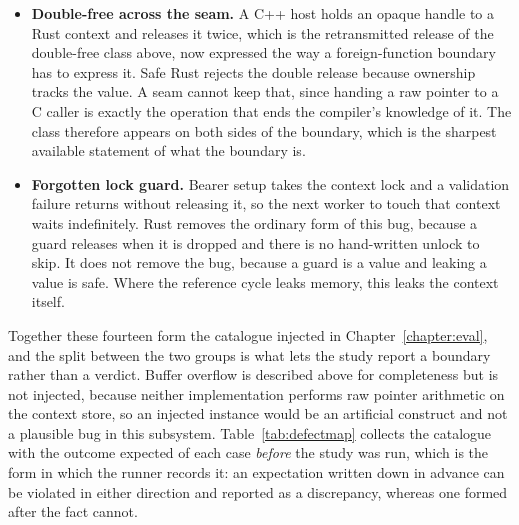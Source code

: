 \documentclass[english,oneside,a4paper,censored,csm,software-track-2020]{HYthesisML}
\begin{document}
\begin{itemize}
        availability argument, and addressed by nothing in either type system.
  \item \textbf{Double-free across the seam.} A C++ host holds an opaque handle to a Rust
        context and releases it twice, which is the retransmitted release of the double-free
        class above, now expressed the way a foreign-function boundary has to express it. Safe
        Rust rejects the double release because ownership tracks the value. A seam cannot keep
        that, since handing a raw pointer to a C caller is exactly the operation that ends the
        compiler's knowledge of it. The class therefore appears on both sides of the boundary,
        which is the sharpest available statement of what the boundary is.
  \item \textbf{Forgotten lock guard.} Bearer setup takes the context lock and a validation
        failure returns without releasing it, so the next worker to touch that context waits
        indefinitely. Rust removes the ordinary form of this bug, because a guard releases when
        it is dropped and there is no hand-written unlock to skip. It does not remove the bug,
        because a guard is a value and leaking a value is safe. Where the reference cycle leaks
        memory, this leaks the context itself.
\end{itemize}

Together these fourteen form the catalogue injected in Chapter~\ref{chapter:eval}, and the
split between the two groups is what lets the study report a boundary rather than a verdict.
Buffer overflow is described above for completeness but is not injected, because neither
implementation performs raw pointer arithmetic on the context store, so an injected instance
would be an artificial construct and not a plausible bug in this subsystem.
Table~\ref{tab:defectmap} collects the catalogue with the outcome expected of each case
\emph{before} the study was run, which is the form in which the runner records it: an
expectation written down in advance can be violated in either direction and reported as a
discrepancy, whereas one formed after the fact cannot.
\end{document}
